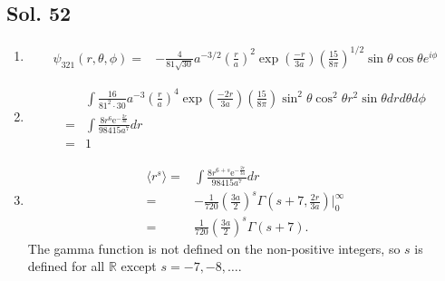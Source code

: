         \subsection*{Sol. 52}
        \begin{enumerate}
            \item 
            \begin{align*}
                \psi_{321}(r,\theta,\phi)
            =&
            -\frac{4}{81\sqrt{30}}
            a^{-3/2}
            \left(\frac{r}{a}\right)^2
            \exp(\frac{-r}{3a})
            \left(
            \frac{15}{8\pi}
            \right)^{1/2}
            \sin\theta\cos\theta 
            e^{i\phi}
            \end{align*}
            \item 
            \begin{align*}
                &\int
                \frac{16}{81^2\cdot30}
            a^{-3}
            \left(\frac{r}{a}\right)^4
            \exp(\frac{-2r}{3a})
            \left(
            \frac{15}{8\pi}
            \right)
            \sin^2\theta\cos^2\theta 
            r^2\sin\theta drd\theta d\phi\\
            =&\int 
            \frac{8r^{6} \mathrm{e}^{-\frac{2r}{3a}}}{98415 a^{7}} dr\\
            =&1
            \end{align*}
            \item 
            \begin{align*}
                \langle r^s\rangle=&\int
                \frac{8r^{6+s} \mathrm{e}^{-\frac{2r}{3a}}}{98415 a^{7}}dr\\
                =&
                -
                \frac{1}{720}
                \left(
                \frac{3a}{2}
                \right)^s\Gamma(s+7, \frac{2r}{3a})\bigg|^{\infty}_0\\
                =&\frac{1}{720}
                \left(
                \frac{3a}{2}
                \right)^s
                \Gamma(s+7).
            \end{align*}
            The gamma function is not defined on the non-positive integers, so $s$ is defined for all $\mathbb{R}$ except $s=-7,-8,\dots.$
        \end{enumerate}

